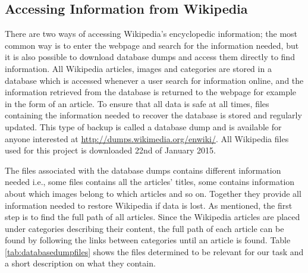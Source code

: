 
\subsection{Accessing Information from Wikipedia}
There are two ways of accessing Wikipedia’s encyclopedic information; the most common way is to enter the webpage and search for the information needed, but it is also possible to download database dumps and access them directly to find information. All Wikipedia articles, images and categories are stored in a database which is accessed whenever a user search for information online, and the information retrieved from the database is returned to the webpage for example in the form of an article. To ensure that all data is safe at all times, files containing the information needed to recover the database is stored and regularly updated.\cite{wiki:databasedownload} This type of backup is called a database dump and is available for anyone interested at \url{http://dumps.wikimedia.org/enwiki/}. All Wikipedia files used for this project is downloaded 22nd of January 2015. 

The files associated with the database dumps contains different information needed i.e., some files contains all the articles' titles, some contains information about which images belong to which articles and so on. Together they provide all information needed to restore Wikipedia if data is lost. 
As mentioned, the first step is to find the full path of all articles. Since the Wikipedia articles are placed under categories describing their content, the full path of each article can be found by following the links between categories until an article is found. Table \ref{tab:databasedumpfiles} shows the files determined to be relevant for our task and a short description on what they contain. 




